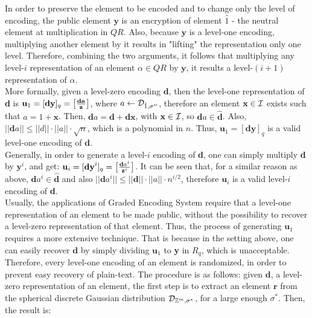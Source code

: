 \begin{enumerate}[label=(\alph*)]
In order to preserve the element to be encoded and to change only the level of encoding, the public element $\textbf{y}$ is an encryption of element $\hat{1}$ - the neutral element at multiplication in $QR$. Also, because $\textbf{y}$ is a level-one encoding, multiplying another element by it results in "lifting" the representation only one level. Therefore, combining the two arguments, it follows that multiplying any level-$i$ representation of an element $\alpha \in QR$ by $\textbf{y}$, it results a level-$(i+1)$ representation of $\alpha$.\\

More formally, given a level-zero encoding $\textbf{d}$, then the level-one representation of \textbf{d} is $\textbf{u}_1 = [\textbf{dy}]_q = \big[ \frac{\textbf{\textbf{da}}}{\textbf{z}} \big]$, where $a \leftarrow \mathcal{D}_{\hat{1}, \sigma''}$, therefore an element $\textbf{x} \in \mathcal{I}$ exists such that $a = 1 + \textbf{x}$. Then, $\textbf{d}a = \textbf{d} + \textbf{dx}$, with $\textbf{x} \in \mathcal{I}$, so $\textbf{d}a \in \hat{\textbf{d}}$. Also, $||\textbf{d}a|| \leq ||d|| \cdot ||a|| \cdot \sqrt{n}$, which is a polynomial in $n$. Thus, $\textbf{u}_1 = [\textbf{dy}]_q$ is a valid level-one encoding of $\textbf{d}$. \\

Generally, in order to generate a level-$i$ encoding of \textbf{d}, one can simply multiply \textbf{d} by $\textbf{y}^i$, and get: $\textbf{u}_i = [\textbf{dy}^i]_q = \big[ \frac{\textbf{d}a^i}{\textbf{z}^i} \big]$. It can be seen that, for a similar reason as above, $\textbf{d}a^i \in \hat{\textbf{d}}$ and also $||\textbf{d}a^i|| \leq ||\textbf{d}|| \cdot ||a|| \cdot n^{i/2}$, therefore $\textbf{u}_i$ is a valid level-$i$ encoding of \textbf{d}.\\

Usually, the applications of Graded Encoding System require that a level-one representation of an element to be made public, without the possibility to recover a level-zero representation of that element. Thus, the process of generating $\textbf{u}_1$ requires a more extensive technique. That is because in the setting above, one can easily recover $\textbf{d}$ by simply dividing $\textbf{u}_1$ to \textbf{y} in $R_q$, which is unacceptable. \\

Therefore, every level-one encoding of an element is randomized, in order to prevent easy recovery of plain-text. The procedure is as follows: given $\textbf{d}$, a level-zero representation of an element, the first step is to extract an element $\textbf{r}$ from the spherical discrete Gaussian distribution $\mathcal{D}_{{\mathbb Z}^m, \sigma^*}$, for a large enough $\sigma^*$. Then, the result is:


\end{enumerate}
